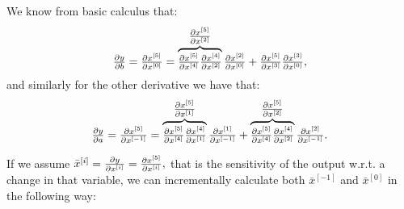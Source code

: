 \documentclass[pdflatex,sn-mathphys-num]{sn-jnl}%
\theoremstyle{thmstyleone}%
\theoremstyle{thmstyletwo}%
\theoremstyle{thmstylethree}%
\begin{document}
We know from basic calculus that: \[
    \textstyle\frac{\partial y}{\partial b} = \textstyle\frac{\partial x^{[5]}}{\partial x^{[0]}}
    = \overbrace{
        \textstyle\frac{\partial x^{[5]}}{\partial x^{[4]}} \textstyle\frac{\partial x^{[4]}}{\partial x^{[2]}}
    }^{\textstyle\frac{\partial x^{[5]}}{\partial x^{[2]}}} \textstyle\frac{\partial x^{[2]}}{\partial x^{[0]}}
    + \textstyle\frac{\partial x^{[5]}}{\partial x^{[3]}} \textstyle\frac{\partial x^{[3]}}{\partial x^{[0]}},
\] and similarly for the other derivative we have that: \[
    \textstyle\frac{\partial y}{\partial a} = \textstyle\frac{\partial x^{[5]}}{\partial x^{[-1]}}
    = \overbrace{
        \textstyle\frac{\partial x^{[5]}}{\partial x^{[4]}} \textstyle\frac{\partial x^{[4]}}{\partial x^{[1]}}
    }^{\textstyle\frac{\partial x^{[5]}}{\partial x^{[1]}}} \textstyle\frac{\partial x^{[1]}}{\partial x^{[-1]}}
    + \overbrace{\textstyle\frac{\partial x^{[5]}}{\partial x^{[4]}} \textstyle\frac{\partial x^{[4]}}{\partial x^{[2]}}
    }^{\textstyle\frac{\partial x^{[5]}}{\partial x^{[2]}}} \textstyle\frac{\partial x^{[2]}}{\partial x^{[-1]}}.
\]

If we assume \(\bar x^{[i]} = \textstyle\frac{\partial y}{\partial x^{[i]}} =
\textstyle\frac{\partial x^{[5]}}{\partial x^{[i]}},\) that is the sensitivity of the output w.r.t. a
change in that variable, we can incrementally calculate both \(\bar x^{[-1]}\)
and \(\bar x^{[0]}\) in the following way:
\end{document}
